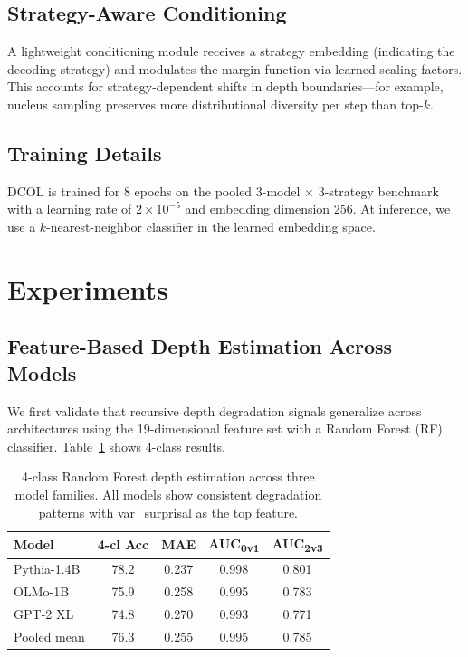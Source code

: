 \documentclass[11pt,a4paper]{article}
\newcommand{\ours}{DCOL}
\begin{document}
\subsection{Strategy-Aware Conditioning}
\label{sec:conditioning}

A lightweight conditioning module receives a strategy embedding (indicating the decoding strategy) and modulates the margin function via learned scaling factors.
This accounts for strategy-dependent shifts in depth boundaries---for example, nucleus sampling preserves more distributional diversity per step than top-$k$.

\subsection{Training Details}

\ours{} is trained for 8 epochs on the pooled 3-model $\times$ 3-strategy benchmark with a learning rate of $2 \times 10^{-5}$ and embedding dimension 256. At inference, we use a $k$-nearest-neighbor classifier in the learned embedding space.

\section{Experiments}
\label{sec:experiments}

\subsection{Feature-Based Depth Estimation Across Models}
\label{sec:feature_based}

We first validate that recursive depth degradation signals generalize across architectures using the 19-dimensional feature set with a Random Forest (RF) classifier.
Table~\ref{tab:rf_3model} shows 4-class results.

\begin{table}[t]
\centering
\small
\begin{tabular}{lcccc}
\toprule
\textbf{Model} & \textbf{4-cl Acc} & \textbf{MAE} & \textbf{AUC\textsubscript{0v1}} & \textbf{AUC\textsubscript{2v3}} \\
\midrule
Pythia-1.4B & 78.2 & 0.237 & 0.998 & 0.801 \\
OLMo-1B    & 75.9 & 0.258 & 0.995 & 0.783 \\
GPT-2 XL   & 74.8 & 0.270 & 0.993 & 0.771 \\
\midrule
Pooled mean & 76.3 & 0.255 & 0.995 & 0.785 \\
\bottomrule
\end{tabular}
\caption{4-class Random Forest depth estimation across three model families. All models show consistent degradation patterns with var\_surprisal as the top feature.}
\label{tab:rf_3model}
\end{table}
\end{document}
